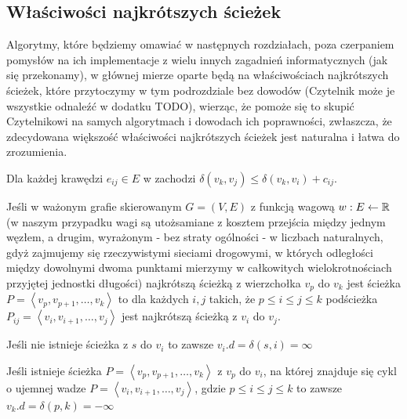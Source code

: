 \subsection{Właściwości najkrótszych ścieżek}
\label{sub:shortestPathProperties}

Algorytmy, które będziemy omawiać w następnych rozdziałach, poza czerpaniem pomysłów na ich implementacje z wielu innych zagadnień informatycznych (jak się przekonamy), w głównej mierze oparte będą na właściwościach najkrótszych ścieżek, które przytoczymy w tym podrozdziale bez dowodów (Czytelnik może je wszystkie odnaleźć w dodatku TODO), wierząc, że pomoże się to skupić Czytelnikowi na samych algorytmach i dowodach ich poprawności, zwłaszcza, że zdecydowana większość właściwości najkrótszych ścieżek jest naturalna i łatwa do zrozumienia.

\begin{lemma}
Dla każdej krawędzi $e_{ij} \in E$ w zachodzi $ \delta \left( v_{k}, v_{j} \right) \leqslant \delta \left( v_{k}, v_{i} \right) + c_{ij}$.
\end{lemma}\label{lem:triangleInequality}

\begin{lemma}
Jeśli w ważonym grafie skierowanym $ G = \left( V, E \right)$ z funkcją wagową $w: E \leftarrow \mathbb{R}$ (w naszym przypadku wagi są utożsamiane z kosztem przejścia między jednym węzłem, a drugim, wyrażonym - bez straty ogólności - w liczbach naturalnych, gdyż zajmujemy się rzeczywistymi sieciami drogowymi, w których odległości między dowolnymi dwoma punktami mierzymy w całkowitych wielokrotnościach przyjętej jednostki długości) najkrótszą ścieżką z wierzchołka $v_{p}$ do $v_{k}$ jest ścieżka $P = \left \langle v_{p}, v_{p+1}, \ldots, v_{k} \right \rangle $ to dla każdych $i,j$ takich, że $p \leqslant i \leqslant j \leqslant k$ podścieżka $P_{ij} = \left \langle v_{i}, v_{i+1}, \ldots, v_{j} \right \rangle $ jest najkrótszą ścieżką z $v_{i}$ do $v_{j}$.
\end{lemma}\label{lem:optimalSubstructure}

\begin{lemma}
Jeśli nie istnieje ścieżka z $s$ do $v_{i}$ to zawsze $v_{i}.d = \delta \left( s, i \right) = \infty$
\end{lemma}\label{lem:noPath}

\begin{lemma}
Jeśli istnieje ścieżka $P = \left \langle v_{p}, v_{p+1}, \ldots, v_{k} \right \rangle $ z $v_{p}$ do $v_{i}$, na której znajduje się cykl o ujemnej wadze $P = \left \langle v_{i}, v_{i+1}, \ldots, v_{j} \right \rangle $, gdzie $p \leqslant i \leqslant j \leqslant k$ to zawsze $v_{k}.d = \delta \left( p, k \right) = - \infty$
\end{lemma}\label{lem:pathWithNegativeCycle}

